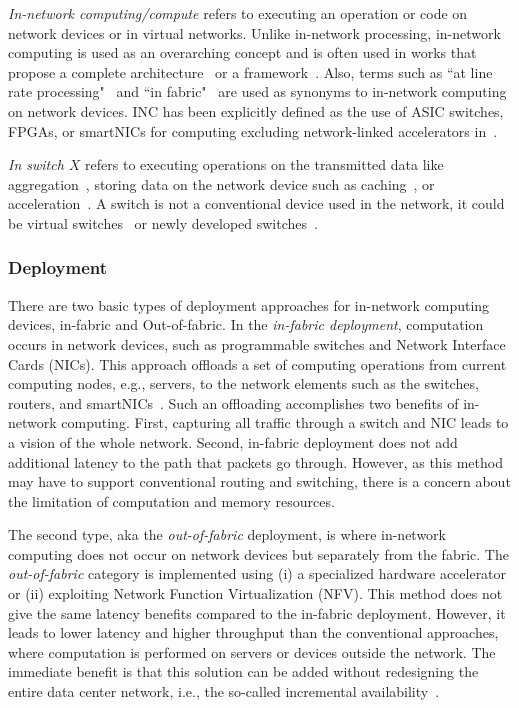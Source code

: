 \textit{In-network computing/compute} refers to executing an operation or code on network devices or in virtual networks. Unlike in-network processing, in-network computing is used as an overarching concept and is often used in works that propose a complete architecture~\cite{10.11453359993.3366649} or a framework~\cite{INC6G}. Also, terms such as ``at line rate processing"~\cite{10.1145/3152434.3152461} and ``in fabric"~\cite{ports2019should} are used as synonyms to in-network computing on network devices. INC has been explicitly defined as the use of ASIC switches, FPGAs, or smartNICs for computing excluding network-linked accelerators in~\cite{NoaZilberman}.   
 
\textit{In switch $X$} refers to executing operations on the transmitted data like aggregation~\cite{InNet, 10.1145/3152434.3152461, sapio2019scaling, yang2019switchagg}, storing data on the network device such as caching~\cite{jin2017netcache}, or acceleration~\cite{tokusashi2018lake}. A switch is not a  conventional device used in the network, it could be virtual switches~\cite{INC6G} or newly developed switches~\cite{zhang2014smartswitch}.  

\subsubsection*{Deployment}
There are two basic types of deployment approaches for in-network computing devices, in-fabric and Out-of-fabric. 
In the \textit{in-fabric deployment}, computation occurs in network devices, such as programmable switches and Network Interface Cards (NICs). This approach offloads a set of computing operations from current computing nodes, e.g., servers, to the network elements such as the switches, routers, and smartNICs~\cite{10.1145/3152434.3152461}. Such an offloading accomplishes two benefits of in-network computing. First, capturing all traffic through a switch and NIC leads to a vision of the whole network. Second, in-fabric deployment does not add additional latency to the path that packets go through. However, as this method may have to support conventional routing and switching, there is a concern about the limitation of computation and memory resources. 

The second type, aka the \textit{out-of-fabric} deployment, is where in-network computing does not occur on network devices but separately from the fabric. The \textit{out-of-fabric} category is implemented using (i) a specialized hardware accelerator or (ii) exploiting Network Function Virtualization (NFV). This method does not give the same latency benefits compared to the in-fabric deployment. However, it leads to lower latency and higher throughput than the conventional approaches, where computation is performed on servers or devices outside the network. The immediate benefit is that this solution can be added without redesigning the entire data center network, i.e., the so-called incremental availability~\cite{Dan2019}.


